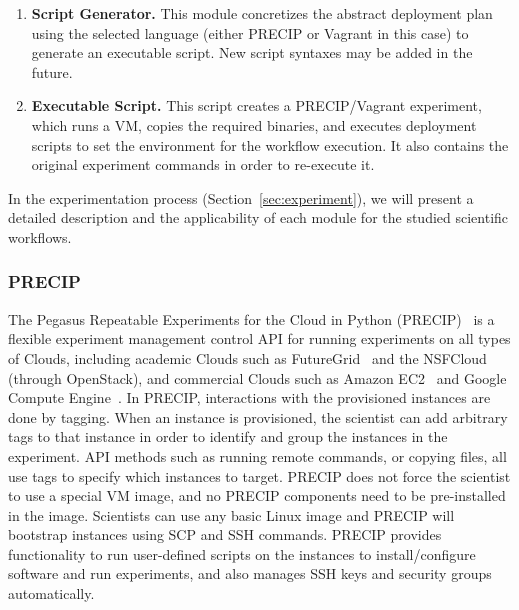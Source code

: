 \begin{enumerate}
	\item \textbf{Script Generator.} This module concretizes the abstract deployment plan using the selected
		language (either PRECIP or Vagrant in this case) to generate an executable script. New script syntaxes 
		may be added in the future.

	\item \textbf{Executable Script.} This script creates a PRECIP/Vagrant experiment, which runs a VM, 
		copies the required binaries, and executes deployment scripts to set the environment for the 
		workflow execution. It also contains the original experiment commands in order to 
		re-execute it.

\end{enumerate}

In the experimentation process (Section~\ref{sec:experiment}), we will present a detailed description 
and the applicability of each module for the studied scientific workflows.



\subsubsection{PRECIP}
The Pegasus Repeatable Experiments for the Cloud in Python (PRECIP)~\cite{Azarnoosh-CRC-2013} 
is a flexible experiment management control API for running experiments on all types of Clouds, 
including academic Clouds such as FutureGrid~\cite{futuregrid} and the NSFCloud~\cite{chameleon,cloudlab}
(through OpenStack), and commercial Clouds such as Amazon EC2~\cite{aws} and Google 
Compute Engine~\cite{gce}. In PRECIP, interactions with the provisioned instances are done by 
tagging. When an instance is provisioned, the scientist can add arbitrary tags to that instance in 
order to identify and group the instances in the experiment. API methods such as running remote 
commands, or copying files, all use tags to specify which instances to target. PRECIP does not 
force the scientist to use a special VM image, and no PRECIP components need to be pre-installed 
in the image. Scientists can use any basic Linux image and PRECIP will bootstrap instances using 
SCP and SSH commands. PRECIP provides functionality to run user-defined scripts on the instances 
to install/configure software and run experiments, and also manages SSH keys and security groups 
automatically.



